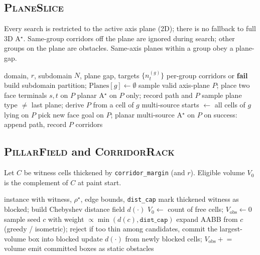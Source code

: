\subsection{\textsc{PlaneSlice}}
\label{app:plane-slice}

Every search is restricted to the active axis plane (2D); there is no fallback
to full 3D A$^\star$. Same-group corridors off the plane are ignored during
search; other groups on the plane are obstacles. Same-axis planes within a
group obey a plane-gap.

\begin{algorithm}[t]
\caption{\textsc{PlaneSlice}: generate witness corridors}
\label{alg:plane-slice}
\begin{algorithmic}[1]
\Require domain, $r$, subdomain $N$, plane gap, targets $\{n_t^{(g)}\}$
\Ensure per-group corridors or \textbf{fail}
\State build subdomain partition; $\mathrm{Planes}[g]\gets\emptyset$
      \State sample valid axis-plane $P$; place two face terminals $s,t$ on $P$
      \State planar A$^\star$ on $P$ only; record path and $P$
    \Else
      \State sample plane type ${\neq}$ last plane; derive $P$ from a cell of $g$
      \State multi-source starts $\gets$ all cells of $g$ lying on $P$
      \State pick new face goal on $P$; planar multi-source A$^\star$ on $P$
      \State on success: append path, record $P$
    \EndIf
  \EndFor
\EndWhile
\State \Return corridors
\end{algorithmic}
\end{algorithm}

\subsection{\textsc{PillarField} and \textsc{CorridorRack}}
\label{app:obstacles}

Let $C$ be witness cells thickened by \texttt{corridor\_margin} (and $r$).
Eligible volume $V_0$ is the complement of $C$ at paint start.

\begin{algorithm}[t]
\caption{\textsc{PillarField}: paint AABB obstacles}
\label{alg:pillar}
\begin{algorithmic}[1]
\Require instance with witness, $\rho^\star$, edge bounds, \texttt{dist\_cap}
\State mark thickened witness as blocked; build Chebyshev distance field $d(\cdot)$
\State $V_0\gets$ count of free cells; $V_{\mathrm{obs}}\gets 0$
  \State sample seed $c$ with weight $\propto \min(d(c),\texttt{dist\_cap})$
  \State expand AABB from $c$ (greedy / isometric); reject if too thin
  \State among candidates, commit the largest-volume box into blocked
  \State update $d(\cdot)$ from newly blocked cells; $V_{\mathrm{obs}}\mathrel{+}=$ volume
\EndWhile
\State emit committed boxes as static obstacles
\end{algorithmic}
\end{algorithm}

